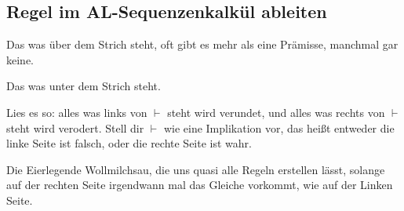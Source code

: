 \documentclass[
    ngerman,
    color=3b,
    summary,
    boxarc,
    main,
    fleqn,
    leqno,
]{rubos-tuda-template}
\begin{document}
    \subsection{Regel im AL-Sequenzenkalkül ableiten}
    \begin{definition}[Prämisse]
        Das was über dem Strich steht, oft gibt es mehr als eine Prämisse, manchmal gar keine.
    \end{definition}
    \begin{definition}[Konklusion]
        Das was unter dem Strich steht.
    \end{definition}
    \begin{definition}[$\vdash$]
        Lies es so: alles was links von $\vdash$ steht wird verundet, und alles was rechts von $\vdash$ steht wird verodert. Stell dir $\vdash$ wie eine Implikation vor, das heißt entweder die linke Seite ist falsch, oder die rechte Seite ist wahr.
    \end{definition}
    \begin{definition}[Regel (Ax)]
        Die Eierlegende Wollmilchsau, die uns quasi alle Regeln erstellen lässt, solange auf der rechten Seite irgendwann mal das Gleiche vorkommt, wie auf der Linken Seite.
    \end{definition}
\end{document}
